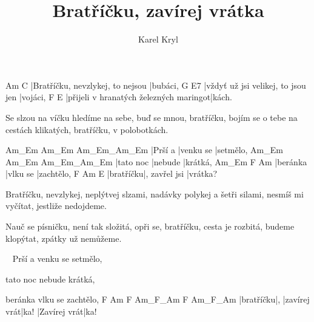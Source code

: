 \documentclass{song}
\title{Bratříčku, zavírej vrátka}
\author{Karel Kryl}
\begin{document}
\strophe
Am                               C
|Bratříčku, nevzlykej, to nejsou |bubáci,
G                                  E7
|vždyť už jsi velikej, to jsou jen |vojáci,
F                                      E
|přijeli v hranatých železných maringot|kách.
\endstrophe

\strophe*
Se slzou na víčku hledíme na sebe,
buď se mnou, bratříčku, bojím se o tebe
na cestách klikatých, bratříčku, v polobotkách.
\endstrophe

Am_Em   Am_Em     Am_Em_Am_Em
|Prší a |venku se |setmělo,
Am_Em     Am_Em   Am_Em_Am_Em
|tato noc |nebude |krátká,
Am_Em    F        Am
|beránka |vlku se |zachtělo,
F         Am            E
|bratříčku|, zavřel jsi |vrátka?
\endstrophe

\strophe*
Bratříčku, nevzlykej, neplýtvej slzami,
nadávky polykej a šetři silami,
nesmíš mi vyčítat, jestliže nedojdeme.
\endstrophe

\strophe*
Nauč se písničku, není tak složitá,
opři se, bratříčku, cesta je rozbitá,
budeme klopýtat, zpátky už nemůžeme.
\endstrophe

~
Prší a venku se setmělo,

tato noc nebude krátká,

beránka vlku se zachtělo,
F         Am F            Am_F_Am F            Am_F_Am
|bratříčku|, |zavírej vrát|ka!    |Zavírej vrát|ka!
\endstrophe
\end{document}
